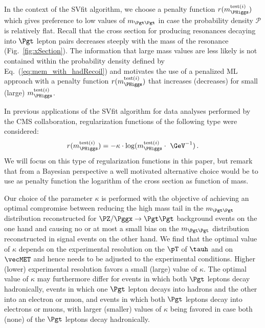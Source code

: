 In the context of the SVfit algorithm, we choose a penalty function $r(m_{\PHiggs}^{\textrm{test}(i)})$
which gives preference to low values of $m_{\Pgt\Pgt}$ 
in case the probability density $\mathcal{P}$ 
is relatively flat.
Recall that the cross section for producing resonances decaying into $\Pgt$ lepton pairs 
decreases steeply with the mass of the resonance (\cf Fig.~\ref{fig:xSection}).
The information that large mass values are less likely is not contained within the probability density defined by Eq.~(\ref{eq:mem_with_hadRecoil})
and motivates the use of a penalized ML approach with a penalty function $r(m_{\PHiggs}^{\textrm{test}(i)})$ 
that increases (decreases) for small (large) $m_{\PHiggs}^{\textrm{test}(i)}$.

In previous applications of the SVfit algorithm for data analyses performed by the CMS collaboration,
regularization functions of the following type were considered:
\begin{equation} 
r(m_{\PHiggs}^{\textrm{test}(i)}) = -\kappa \cdot \log(m_{\PHiggs}^{\textrm{test}(i)} \cdot \mbox{~\GeV}^{-1}) \, .
\label{eq:logM}
\end{equation}
We will focus on this type of regularization functions in this paper,
but remark that from a Bayesian perspective a well motivated alternative choice 
would be to use as penalty function the logarithm of the cross section as function of mass.

Our choice of the parameter $\kappa$ is performed with the objective of achieving an
optimal compromise between reducing the high mass tail in the $m_{\Pgt\Pgt}$ distribution reconstructed for 
$\PZ/\Pggx \to \Pgt\Pgt$ background events on the one hand and 
causing no or at most a small bias on the $m_{\Pgt\Pgt}$ distribution
reconstructed in signal events on the other hand.
We find that the optimal value of $\kappa$ depends on the experimental
resolution on the $\pT$ of $\tauh$ and on $\vecMET$ and hence needs to be adjusted to the experimental conditions.
Higher (lower) experimental resolution favors a small (large) value of $\kappa$. 
The optimal value of $\kappa$ may furthermore differ 
for events in which both $\Pgt$ leptons decay hadronically,
events in which one $\Pgt$ lepton decays into hadrons and the other into an electron or muon,
and events in which both $\Pgt$ leptons decay into electrons or muons,
with larger (smaller) values of $\kappa$ being favored in case both (none) of the $\Pgt$ leptons decay hadronically.

